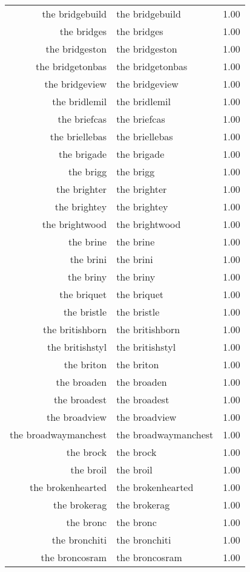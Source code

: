 \begin{table}[ht]
\begin{tabular}{rlr}
  the bridgebuild & the bridgebuild & 1.00 \\ 
  the bridges & the bridges & 1.00 \\ 
  the bridgeston & the bridgeston & 1.00 \\ 
  the bridgetonbas & the bridgetonbas & 1.00 \\ 
  the bridgeview & the bridgeview & 1.00 \\ 
  the bridlemil & the bridlemil & 1.00 \\ 
  the briefcas & the briefcas & 1.00 \\ 
  the briellebas & the briellebas & 1.00 \\ 
  the brigade & the brigade & 1.00 \\ 
  the brigg & the brigg & 1.00 \\ 
  the brighter & the brighter & 1.00 \\ 
  the brightey & the brightey & 1.00 \\ 
  the brightwood & the brightwood & 1.00 \\ 
  the brine & the brine & 1.00 \\ 
  the brini & the brini & 1.00 \\ 
  the briny & the briny & 1.00 \\ 
  the briquet & the briquet & 1.00 \\ 
  the bristle & the bristle & 1.00 \\ 
  the britishborn & the britishborn & 1.00 \\ 
  the britishstyl & the britishstyl & 1.00 \\ 
  the briton & the briton & 1.00 \\ 
  the broaden & the broaden & 1.00 \\ 
  the broadest & the broadest & 1.00 \\ 
  the broadview & the broadview & 1.00 \\ 
  the broadwaymanchest & the broadwaymanchest & 1.00 \\ 
  the brock & the brock & 1.00 \\ 
  the broil & the broil & 1.00 \\ 
  the brokenhearted & the brokenhearted & 1.00 \\ 
  the brokerag & the brokerag & 1.00 \\ 
  the bronc & the bronc & 1.00 \\ 
  the bronchiti & the bronchiti & 1.00 \\ 
  the broncosram & the broncosram & 1.00 \\ 

\end{tabular}
\end{table}
